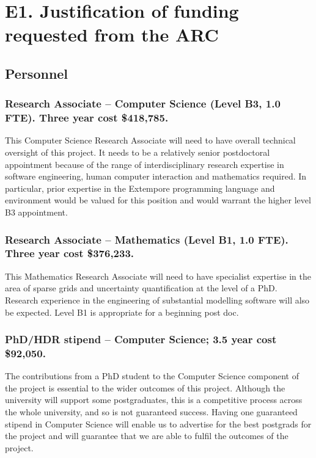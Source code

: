 \documentclass[a4paper,twoside,12pt,compact]{article}
\author{}
\date{\today}
\begin{document}
\section*{E1. Justification of funding requested from the ARC}
\label{sec:justificatoin}

\subsection*{Personnel}


\subsubsection*{Research Associate – Computer Science (Level B3, 1.0 FTE). Three year cost \$418,785.}

This Computer Science Research Associate will need to have overall technical oversight of this project. It needs to be a relatively senior postdoctoral appointment because of the range of interdisciplinary research expertise in software engineering, human computer interaction and mathematics required. In particular, prior expertise in the Extempore programming language and environment would be valued for this position and would warrant the higher level B3 appointment.


\subsubsection*{Research Associate – Mathematics (Level B1, 1.0 FTE).  Three year cost \$376,233.}

This Mathematics Research Associate will need to have specialist expertise in the area of sparse grids and uncertainty quantification at the level of a PhD.  Research experience in the engineering of substantial modelling software will also be expected. Level B1 is appropriate for a beginning post doc. 

\subsubsection*{PhD/HDR stipend – Computer Science;  3.5 year cost \$92,050.}

The contributions from a PhD student to the Computer Science component of the project is essential to the wider outcomes of this project.
Although the university will support some postgraduates, this is a competitive
process across the whole university, and so is not guaranteed success. Having one guaranteed stipend in Computer Science will enable us to advertise for the best postgrads for the project and will guarantee that we are able to fulfil the outcomes of the project. 
\end{document}
